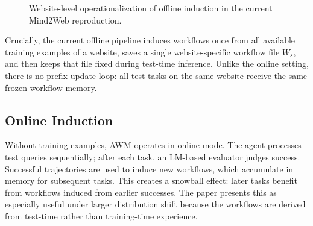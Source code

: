 \documentclass{article}
\begin{document}
\begin{figure}[htbp]
\centering
{}
\caption{Website-level operationalization of offline induction in the current Mind2Web reproduction.}
\label{fig:offline-induction-one-shot}
\end{figure}

Crucially, the current offline pipeline induces workflows once from all
available training examples of a website, saves a single
website-specific workflow file \(W_s\), and then keeps that file fixed
during test-time inference. Unlike the online setting, there is no
prefix update loop: all test tasks on the same website receive the same
frozen workflow memory.

\subsection{Online Induction}\label{online-induction}

Without training examples, AWM operates in online mode. The agent
processes test queries sequentially; after each task, an LM-based
evaluator judges success. Successful trajectories are used to induce new
workflows, which accumulate in memory for subsequent tasks. This creates
a snowball effect: later tasks benefit from workflows induced from
earlier successes. The paper presents this as especially useful under
larger distribution shift because the workflows are derived from
test-time rather than training-time experience.
\end{document}
